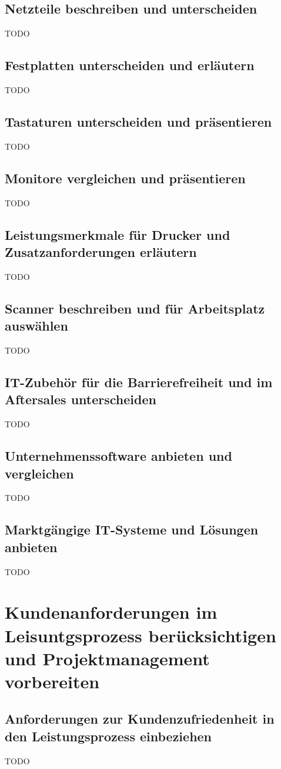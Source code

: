 \documentclass[11pt]{article}
\begin{document}
\subsection{Netzteile beschreiben und unterscheiden}
    TODO
\subsection{Festplatten unterscheiden und erläutern}
    TODO
\subsection{Tastaturen unterscheiden und präsentieren}
    TODO
\subsection{Monitore vergleichen und präsentieren}
    TODO
\subsection{Leistungsmerkmale für Drucker und Zusatzanforderungen erläutern}
    TODO
\subsection{Scanner beschreiben und für Arbeitsplatz auswählen}
    TODO
\subsection{IT-Zubehör für die Barrierefreiheit und im Aftersales unterscheiden}
    TODO
\subsection{Unternehmenssoftware anbieten und vergleichen}
    TODO
\subsection{Marktgängige IT-Systeme und Lösungen anbieten}
    TODO

\newpage
\section{Kundenanforderungen im Leisuntgsprozess berücksichtigen und Projektmanagement vorbereiten}
\subsection{Anforderungen zur Kundenzufriedenheit in den Leistungsprozess einbeziehen}
    TODO
\end{document}

